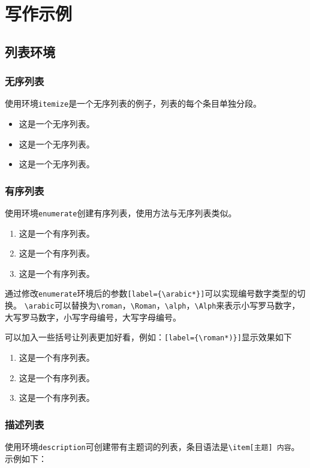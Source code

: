 \chapter{写作示例}
\section{列表环境}

\subsection{无序列表}

使用环境\verb+itemize+是一个无序列表的例子，列表的每个条目单独分段。

\begin{itemize}
	\item 这是一个无序列表。
	\item 这是一个无序列表。
	\item 这是一个无序列表。
\end{itemize}

\subsection{有序列表}

使用环境\verb+enumerate+创建有序列表，使用方法与无序列表类似。

\begin{enumerate}[label={\arabic*}]
	\item 这是一个有序列表。
	\item 这是一个有序列表。
	\item 这是一个有序列表。
\end{enumerate}

通过修改\verb+enumerate+环境后的参数\verb+[label={\arabic*}]+可以实现编号数字类型的切换。
\verb+\arabic+可以替换为\verb+\roman+，\verb+\Roman+，\verb+\alph+，\verb+\Alph+来表示小写罗马数字，大写罗马数字，小写字母编号，大写字母编号。

可以加入一些括号让列表更加好看，例如：\verb+[label={\roman*)}]+显示效果如下

\begin{enumerate}[label={\roman*)}]
	\item 这是一个有序列表。
	\item 这是一个有序列表。
	\item 这是一个有序列表。
\end{enumerate}
\subsection{描述列表}
使用环境\verb+description+可创建带有主题词的列表，条目语法是\verb+\item[主题] 内容+。示例如下：

